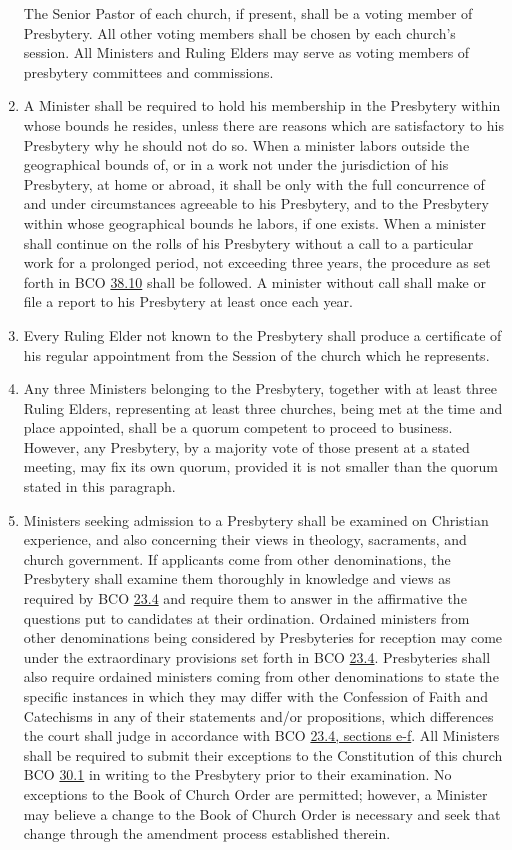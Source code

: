 \documentclass[
]{book}
\begin{document}
\begin{enumerate}
  The Senior Pastor of each church, if present, shall be a voting member of Presbytery. All other voting members shall be chosen by each church's session. All Ministers and Ruling Elders may serve as voting members of presbytery committees and commissions.
\item
  \protect\hypertarget{15.2}{\href{}{}}A Minister shall be required to hold his membership in the Presbytery within whose bounds he resides, unless there are reasons which are satisfactory to his Presbytery why he should not do so. When a minister labors outside the geographical bounds of, or in a work not under the jurisdiction of his Presbytery, at home or abroad, it shall be only with the full concurrence of and under circumstances agreeable to his Presbytery, and to the Presbytery within whose geographical bounds he labors, if one exists. When a minister shall continue on the rolls of his Presbytery without a call to a particular work for a prolonged period, not exceeding three years, the procedure as set forth in BCO \protect\hyperlink{38.10}{38.10} shall be followed. A minister without call shall make or file a report to his Presbytery at least once each year.
\item
  Every Ruling Elder not known to the Presbytery shall produce a certificate of his regular appointment from the Session of the church which he represents.
\item
  Any three Ministers belonging to the Presbytery, together with at least three Ruling Elders, representing at least three churches, being met at the time and place appointed, shall be a quorum competent to proceed to business. However, any Presbytery, by a majority vote of those present at a stated meeting, may fix its own quorum, provided it is not smaller than the quorum stated in this paragraph.
\item
  Ministers seeking admission to a Presbytery shall be examined on Christian experience, and also concerning their views in theology, sacraments, and church government. If applicants come from other denominations, the Presbytery shall examine them thoroughly in knowledge and views as required by BCO \protect\hyperlink{23.4}{23.4} and require them to answer in the affirmative the questions put to candidates at their ordination. Ordained ministers from other denominations being considered by Presbyteries for reception may come under the extraordinary provisions set forth in BCO \protect\hyperlink{23.4}{23.4}. Presbyteries shall also require ordained ministers coming from other denominations to state the specific instances in which they may differ with the Confession of Faith and Catechisms in any of their statements and/or propositions, which differences the court shall judge in accordance with BCO \protect\hyperlink{23.4.e}{23.4, sections e-f}. All Ministers shall be required to submit their exceptions to the Constitution of this church BCO \protect\hyperlink{30.1}{30.1} in writing to the Presbytery prior to their examination. No exceptions to the Book of Church Order are permitted; however, a Minister may believe a change to the Book of Church Order is necessary and seek that change through the amendment process established therein.

\end{enumerate}
\end{document}
